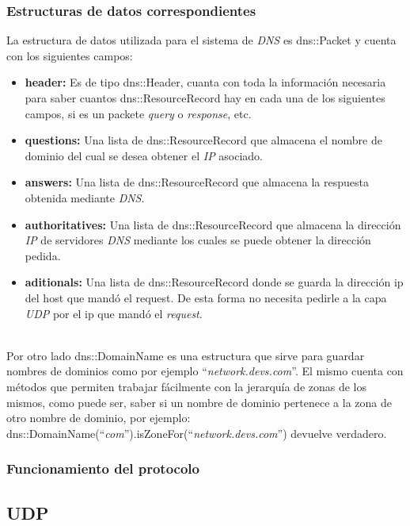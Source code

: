 \documentclass[10pt,a4paper]{article}
\begin{document}
\subsubsection{Estructuras de datos correspondientes}
La estructura de datos utilizada para el sistema de \textit{DNS} es dns::Packet y cuenta con los siguientes campos:
\begin{itemize}
\item \textbf{header: } Es de tipo dns::Header, cuanta con toda la información necesaria para saber cuantos dns::ResourceRecord hay en cada una de los siguientes campos, si es un packete \textit{query} o \textit{response}, etc.
\item \textbf{questions: } Una lista de dns::ResourceRecord que almacena el nombre de dominio del cual se desea obtener el \textit{IP} asociado.
\item \textbf{answers: } Una lista de dns::ResourceRecord que almacena la respuesta obtenida mediante \textit{DNS}.
\item \textbf{authoritatives: } Una lista de dns::ResourceRecord que almacena la dirección \textit{IP} de servidores \textit{DNS} mediante los cuales se puede obtener la dirección pedida.
\item \textbf{aditionals: } Una lista de dns::ResourceRecord donde se guarda la dirección ip del host que mandó el request. De esta forma no necesita pedirle a la capa \textit{UDP} por el ip que mandó el \textit{request}.
\end{itemize}

 \\

Por otro lado dns::DomainName es una estructura que sirve para guardar nombres de dominios como por ejemplo ``\textit{network.devs.com}''. El mismo cuenta con métodos que permiten trabajar fácilmente con la jerarquía de zonas de los mismos, como puede ser, saber si un nombre de dominio pertenece a la zona de otro nombre de dominio, por ejemplo: \\

dns::DomainName(``\textit{com}'').isZoneFor(``\textit{network.devs.com}'') devuelve verdadero.
\subsubsection{Funcionamiento del protocolo}


\subsection{UDP}
\end{document}
